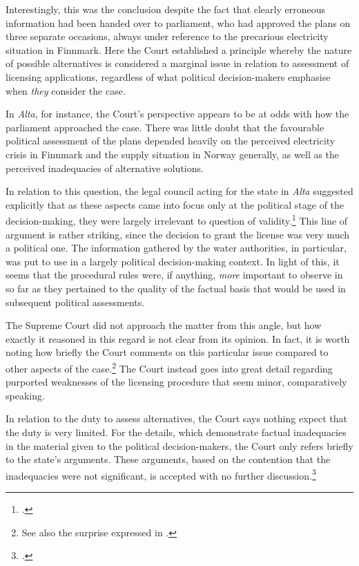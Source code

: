 Interestingly, this was the conclusion despite the fact that clearly erroneous information had been  handed over to parliament, who had approved the plans on three separate occasions, always under reference to the precarious electricity situation in Finnmark. Here the Court established a principle whereby the nature of possible alternatives is considered a marginal issue in relation to assessment of licensing applications, regardless of what political decision-makers emphasise when {\it they} consider the case. 

In {\it Alta}, for instance, the Court's perspective appears to be at odds with how the parliament approached the case. There was little doubt that the favourable political assessment of the plans depended heavily on the perceived electricity crisis in Finnmark and the supply situation in Norway generally, as well as the perceived inadequacies of alternative solutions.

In relation to this question, the legal council acting for the state in {\it Alta} suggested explicitly that as these aspects came into focus only at the political stage of the decision-making, they were largely irrelevant to question of validity.\footcite[341]{alta82} This line of argument is rather striking, since the decision to grant the license was very much a political one. The information gathered by the water authorities, in particular, was put to use in a largely political decision-making context. In light of this, it seems that the procedural rules were, if anything, {\it more} important to observe in so far as they pertained to the quality of the factual basis that would be used in subsequent political assessments.

The Supreme Court did not approach the matter from this angle, but how exactly it reasoned in this regard is not clear from its opinion. In fact, it is worth noting how briefly the Court comments on this particular issue compared to other aspects of the case.\footnote{See also the surprise expressed in \cite[349-351]{eckhoff82}.} The Court instead goes into great detail regarding purported weaknesses of the licensing procedure that seem minor, comparatively speaking.

In relation to the duty to assess alternatives, the Court says nothing expect that the duty is very limited. For the details, which demonstrate factual inadequacies in the material given to the political decision-makers, the Court only refers briefly to the state's arguments. These arguments, based on the contention that the inadequacies were not significant, is accepted with no further discussion.\footcite[346]{alta82}

